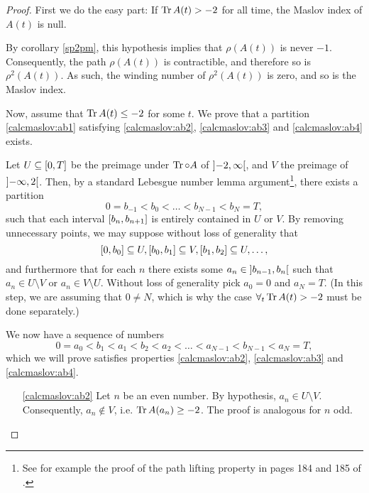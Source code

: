 \begin{proof}
First we do the easy part: If $\operatorname{Tr} A(t) > -2$ for all time, the Maslov index of $A(t)$ is null.

By corollary \ref{sp2pm}, this hypothesis implies that $\rho(A(t))$ is never $-1$. Consequently, the path $\rho(A(t))$ is contractible, and therefore so is $\rho^2(A(t))$. As such, the winding number of $\rho^2(A(t))$ is zero, and so is the Maslov index.

Now, assume that $\operatorname{Tr} A(t) \leq -2$ for some $t$. We prove that a partition \eqref{calcmaslov:ab1} satisfying \ref{calcmaslov:ab2}, \ref{calcmaslov:ab3} and \ref{calcmaslov:ab4} exists.

Let $U \subseteq \interval 0 T$ be the preimage under $\operatorname{Tr} \circ A$ of $\ointerval{-2}\infty$, and $V$ the preimage of $\ointerval{-\infty}2$. Then, by a standard Lebesgue number lemma argument\footnote{See for example the proof of the path lifting property in pages 184 and 185 of \cite{leetopological}.}, there exists a partition 
\begin{equation}
0 = b_{-1} < b_0 < \dots < b_{N-1} < b_N = T,
\end{equation}
such that each interval $\interval{b_n}{b_{n+1}}$ is entirely contained in $U$ or $V$. By removing unnecessary points, we may suppose without loss of generality that
\begin{equation}
\interval{0}{b_0} \subseteq U, \interval{b_0}{b_1} \subseteq V, \interval{b_1}{b_2} \subseteq U, \dots,
\end{equation}
and furthermore that for each $n$ there exists some $a_n \in \ointerval{b_{n-1}}{b_{n}}$ such that $a_n \in U \setminus V$ or $a_n \in V \setminus U$. Without loss of generality pick $a_0 = 0$ and $a_N = T$. (In this step, we are assuming that $0 \neq N$, which is why the case $\forall_t \operatorname{Tr} A(t) > -2$ must be done separately.)

We now have a sequence of numbers
\begin{equation}\label{tcineq}
0 = a_0 < b_1 < a_1 < b_2 < a_2 < \dots < a_{N-1} < b_{N-1} < a_{N} = T,
\end{equation}
which we will prove satisfies properties \ref{calcmaslov:ab2}, \ref{calcmaslov:ab3} and \ref{calcmaslov:ab4}.

\begin{itemize}
\item [\ref{calcmaslov:ab2}] Let $n$ be an even number. By hypothesis, $a_n \in U \setminus V$. Consequently, $a_n \not \in V$, i.e. $\operatorname{Tr} A(a_n) \geq -2$. The proof is analogous for $n$ odd.


\end{itemize}
\end{proof}
